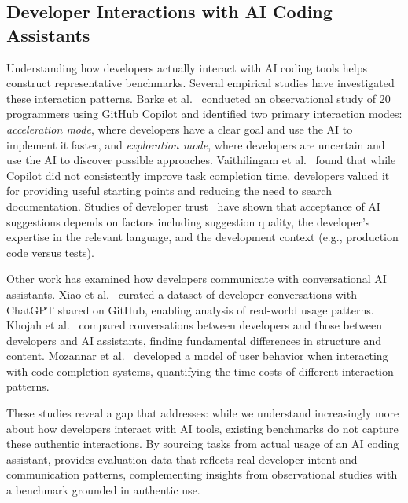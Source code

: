 \subsection{Developer Interactions with AI Coding Assistants}

Understanding how developers actually interact with AI coding tools helps construct representative benchmarks. Several empirical studies have investigated these interaction patterns. Barke et al.~\cite{barkeGroundedCopilotHow2023} conducted an observational study of 20 programmers using GitHub Copilot and identified two primary interaction modes: \emph{acceleration mode}, where developers have a clear goal and use the AI to implement it faster, and \emph{exploration mode}, where developers are uncertain and use the AI to discover possible approaches. Vaithilingam et al.~\cite{vaithilingamExpectationVsExperience2022} found that while Copilot did not consistently improve task completion time, developers valued it for providing useful starting points and reducing the need to search documentation. Studies of developer trust~\cite{brownIdentifyingFactorsThat2024} have shown that acceptance of AI suggestions depends on factors including suggestion quality, the developer's expertise in the relevant language, and the development context (e.g., production code versus tests).

Other work has examined how developers communicate with conversational AI assistants. Xiao et al.~\cite{xiaoDevGPTStudyingDeveloperChatGPT2024} curated a dataset of developer conversations with ChatGPT shared on GitHub, enabling analysis of real-world usage patterns. Khojah et al.~\cite{khojahHumantoHumanHumantoBotConversations2024} compared conversations between developers and those between developers and AI assistants, finding fundamental differences in structure and content. Mozannar et al.~\cite{mozannarReadingLinesModeling2024} developed a model of user behavior when interacting with code completion systems, quantifying the time costs of different interaction patterns.

These studies reveal a gap that \benchmark{} addresses: while we understand increasingly more about how developers interact with AI tools, existing benchmarks do not capture these authentic interactions. By sourcing tasks from actual usage of an AI coding assistant, \benchmark{} provides evaluation data that reflects real developer intent and communication patterns, complementing insights from observational studies with a benchmark grounded in authentic use.


